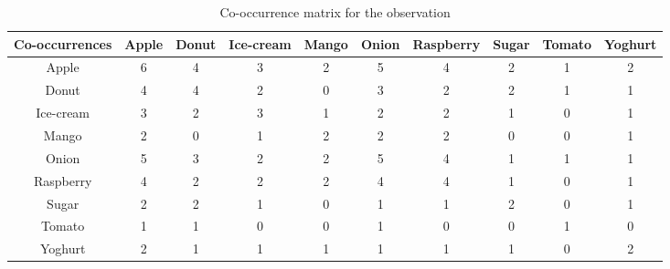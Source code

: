 \documentclass[fontsize=12pt, usenames, dvipsnames, headinclude, headsepline, footinclude, footsepline]{scrartcl}
\begin{document}
\begin{table}[h]
\centering
\caption{Co-occurrence matrix for the observation}
\label{table:co-occ}
{ \footnotesize 
\begin{tabular}{@{}c|ccccccccc@{}}
\toprule
Co-occurrences & Apple & Donut & Ice-cream & Mango & Onion & Raspberry & Sugar & Tomato & Yoghurt \\ \midrule
Apple          & 6     & 4     & 3         & 2     & 5     & 4         & 2     & 1      & 2       \\
Donut          & 4     & 4     & 2         & 0     & 3     & 2         & 2     & 1      & 1       \\
Ice-cream      & 3     & 2     & 3         & 1     & 2     & 2         & 1     & 0      & 1       \\
Mango          & 2     & 0     & 1         & 2     & 2     & 2         & 0     & 0      & 1       \\
Onion          & 5     & 3     & 2         & 2     & 5     & 4         & 1     & 1      & 1       \\
Raspberry      & 4     & 2     & 2         & 2     & 4     & 4         & 1     & 0      & 1       \\
Sugar          & 2     & 2     & 1         & 0     & 1     & 1         & 2     & 0      & 1       \\
Tomato         & 1     & 1     & 0         & 0     & 1     & 0         & 0     & 1      & 0       \\
Yoghurt        & 2     & 1     & 1         & 1     & 1     & 1         & 1     & 0      & 2       \\ \bottomrule
\end{tabular}
}
\end{table}
\end{document}
